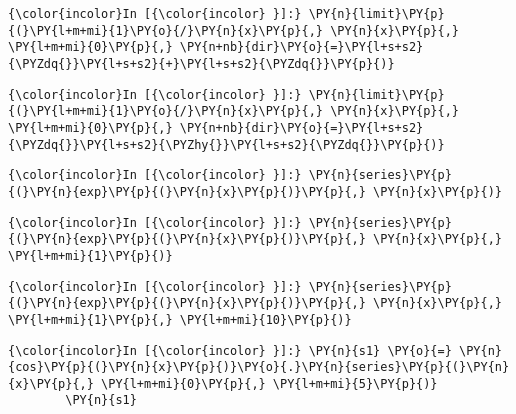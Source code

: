     \begin{Verbatim}[commandchars=\\\{\}]
{\color{incolor}In [{\color{incolor} }]:} \PY{n}{limit}\PY{p}{(}\PY{l+m+mi}{1}\PY{o}{/}\PY{n}{x}\PY{p}{,} \PY{n}{x}\PY{p}{,} \PY{l+m+mi}{0}\PY{p}{,} \PY{n+nb}{dir}\PY{o}{=}\PY{l+s+s2}{\PYZdq{}}\PY{l+s+s2}{+}\PY{l+s+s2}{\PYZdq{}}\PY{p}{)}
\end{Verbatim}

    \begin{Verbatim}[commandchars=\\\{\}]
{\color{incolor}In [{\color{incolor} }]:} \PY{n}{limit}\PY{p}{(}\PY{l+m+mi}{1}\PY{o}{/}\PY{n}{x}\PY{p}{,} \PY{n}{x}\PY{p}{,} \PY{l+m+mi}{0}\PY{p}{,} \PY{n+nb}{dir}\PY{o}{=}\PY{l+s+s2}{\PYZdq{}}\PY{l+s+s2}{\PYZhy{}}\PY{l+s+s2}{\PYZdq{}}\PY{p}{)}
\end{Verbatim}





    \begin{Verbatim}[commandchars=\\\{\}]
{\color{incolor}In [{\color{incolor} }]:} \PY{n}{series}\PY{p}{(}\PY{n}{exp}\PY{p}{(}\PY{n}{x}\PY{p}{)}\PY{p}{,} \PY{n}{x}\PY{p}{)}
\end{Verbatim}



    \begin{Verbatim}[commandchars=\\\{\}]
{\color{incolor}In [{\color{incolor} }]:} \PY{n}{series}\PY{p}{(}\PY{n}{exp}\PY{p}{(}\PY{n}{x}\PY{p}{)}\PY{p}{,} \PY{n}{x}\PY{p}{,} \PY{l+m+mi}{1}\PY{p}{)}
\end{Verbatim}



    \begin{Verbatim}[commandchars=\\\{\}]
{\color{incolor}In [{\color{incolor} }]:} \PY{n}{series}\PY{p}{(}\PY{n}{exp}\PY{p}{(}\PY{n}{x}\PY{p}{)}\PY{p}{,} \PY{n}{x}\PY{p}{,} \PY{l+m+mi}{1}\PY{p}{,} \PY{l+m+mi}{10}\PY{p}{)}
\end{Verbatim}



    \begin{Verbatim}[commandchars=\\\{\}]
{\color{incolor}In [{\color{incolor} }]:} \PY{n}{s1} \PY{o}{=} \PY{n}{cos}\PY{p}{(}\PY{n}{x}\PY{p}{)}\PY{o}{.}\PY{n}{series}\PY{p}{(}\PY{n}{x}\PY{p}{,} \PY{l+m+mi}{0}\PY{p}{,} \PY{l+m+mi}{5}\PY{p}{)}
        \PY{n}{s1}
\end{Verbatim}

